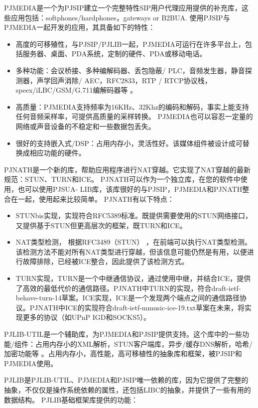 \documentclass[a4paper,AutoFakeBold,oneside,12pt]{book}
\begin{document}
PJMEDIA是一个为PJSIP建立一个完整特性SIP用户代理应用提供的补充库，这些应用包括：softphones/hardphones，gateways or B2BUA. 使用PJSIP与PJMEDIA一起开发的应用，其具备如下的特性：

\begin{itemize}
\item 高度的可移殖性，与PJSIP/PJLIB一起，PJMEDIA可运行在许多平台上，包括服务器、桌面、PDA系统，定制的硬件、PDA或移动电话。
\item 多种功能：会议桥接、多种编解码器、丢包隐蔽/ PLC，音频发生器，静音探测器，声学回声消除/ AEC，RFC2833，RTP / RTCP协议栈，speex/iLBC/GSM/G.711编解码器等 。
\item 高质量：PJMEDIA支持频率为16KHz、32Khz的编码和解码，事实上能支持任何音频采样率，可提供高质量的采样转换。 PJMEDIA也可以容忍一定量的网络或声音设备的不稳定和一些数据包丢失。
\item 很好的支持嵌入式/DSP：占用内存小，灵活性好。该媒体组件被设计成可替换成相应功能的硬件。
\end{itemize}

PJNATH是一个新的库，帮助应用程序进行NAT穿越。它实现了NAT穿越的最新规范：STUN、TURN和ICE。 PJNATH可以作为一个独立库，在您的软件中使用，也可以使用PJSUA- LIB库，该库很好的与PJSIP，PJMEDIA和PJNATH整合在一起，使用起来比较简单。 PJNATH有以下特点：

\begin{itemize}
\item STUNbis实现，实现符合RFC5389标准。既提供需要使用的STUN网络接口，又提供基于STUN但更高层次的框架，既TURN和ICE。
\item NAT类型检测，
根据RFC3489（STUN） ，在前端可以执行NAT类型检测。该检测方法不能对所有NAT类型进行穿越，但该信息可能仍然是有用，以便进行故障排除，已经被ICE整合，因此提供了该检测方式。
\item TURN实现，TURN是一个中继通信协议，通过使用中继，并结合ICE，提供了高效的最低代价的通信路径。PJNATH中TURN的实现，符合draft-ietf-behave-turn-14草案。ICE实现，ICE是一个发现两个端点之间的通信路径协议。PJNATH中ICE的实现符合draft-ietf-mmusic-ice-19.txt草案在未来，将实现更多的协议（如UPnP IGD和SOCKS5）。
\end{itemize}

PJLIB-UTIL是一个辅助库，为PJMEDIA和PJSIP提供支持。这个库中的一些功能/组件：占用内存小的XML解析，STUN客户端库，异步/缓存DNS解析，哈希/加密功能等 。占用内存小，高性能，高可移植性的抽象库和框架，被PJSIP和PJMEDIA使用。

PJLIB是PJLIB-UTIL、PJMEDIA和PJSIP唯一依赖的库，因为它提供了完整的抽象，不仅仅是操作系统依赖的属性，还包括LIBC的抽象，并提供了一些有用的数据结构。 PJLIB基础框架库提供的功能：
\end{document}
